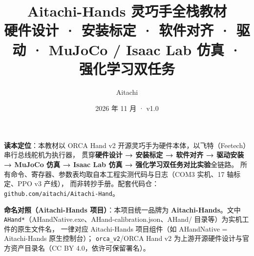 \documentclass[UTF8,a4paper,11pt]{ctexart}
\title{\Huge\textbf{Aitachi-Hands 灵巧手全栈教材}\\[6pt]
\Large 硬件设计 · 安装标定 · 软件对齐 · 驱动 · MuJoCo / Isaac Lab 仿真 · 强化学习双任务}
\author{Aitachi}
\date{2026 年 11 月 · v1.0}
\newcommand{\code}[1]{\texttt{#1}}
\begin{document}
\maketitle
\thispagestyle{fancy}

\begin{keybox}
\textbf{读本定位}：本教材以 ORCA Hand v2 开源灵巧手为硬件本体，以飞特（Feetech）串行总线舵机为执行器，
贯穿\textbf{硬件设计 → 安装标定 → 软件对齐 → 驱动安装 → MuJoCo 仿真 → Isaac Lab 仿真 → 强化学习双任务对比实验}全链路。
所有命令、寄存器、参数表均取自本工程实测代码与日志（COM3 实机、17 轴标定、PPO v3 产线），
而非转抄手册。配套代码仓：\code{github.com/aitachi/Aitachi-Hand}。
\end{keybox}

\begin{keybox}
\textbf{命名对照（Aitachi-Hands 项目）}：本项目统一品牌为 \textbf{Aitachi-Hands}。文中
\code{AHand*}（AHandNative.exe、AHand-calibration.json、AHand/ 目录等）为实机工件的原生文件名，
一律对应 Aitachi-Hands 项目组件（如 AHandNative = Aitachi-Hands 原生控制台）；
\code{orca\_v2}/ORCA Hand v2 为上游开源硬件设计与官方资产目录名（CC BY 4.0，依许可保留署名）。
\end{keybox}

\tableofcontents
\newpage









\end{document}
